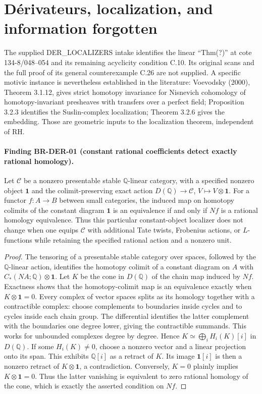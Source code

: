 \section{D\'erivateurs, localization, and information forgotten}
\label{sec:root-derivators}

The supplied DER\_LOCALIZERS intake identifies the linear
``Thm(?)'' at cote 134-8/048--054 and its remaining acyclicity
condition C.10.  Its original scans and the full proof of its
general counterexample C.26 are not supplied.  A specific motivic
instance is nevertheless established in the literature:
Voevodsky (2000), Theorem 3.1.12, gives strict homotopy invariance
for Nisnevich cohomology of homotopy-invariant presheaves with
transfers over a perfect field; Proposition 3.2.3 identifies the
Suslin-complex localization; Theorem 3.2.6 gives the embedding.
Those are geometric inputs to the localization theorem, independent
of RH.

\paragraph{Finding BR-DER-01 (constant rational coefficients detect exactly
rational homology).}
Let $\mathcal C$ be a nonzero presentable stable
$\mathbb Q$-linear category, with a specified nonzero object
$\mathbf1$ and the colimit-preserving exact action
$D(\mathbb Q)\to\mathcal C$, $V\mapsto V\otimes\mathbf1$.
For a functor $f:A\to B$ between small categories, the induced map
on homotopy colimits of the constant diagram $\mathbf1$ is an
equivalence if and only if $Nf$ is a rational homology equivalence.
Thus this particular constant-object localizer does not change
when one equips $\mathcal C$ with additional Tate twists,
Frobenius actions, or $L$-functions while retaining the specified
rational action and a nonzero unit.

\begin{proof}
The tensoring of a presentable stable category over spaces, followed
by the $\mathbb Q$-linear action, identifies the homotopy colimit
of a constant diagram on $A$ with
$C_*(NA;\mathbb Q)\otimes\mathbf1$.  Let $K$ be the cone in
$D(\mathbb Q)$ of the chain map induced by $Nf$.  Exactness shows
that the homotopy-colimit map is an equivalence exactly when
$K\otimes\mathbf1=0$.
Every complex of vector spaces splits as its homology together
with a contractible complex: choose complements to boundaries
inside cycles and to cycles inside each chain group.  The
differential identifies the latter complement with the
boundaries one degree lower, giving the contractible summands.
This works for unbounded complexes degree by degree.  Hence
$K\simeq\bigoplus_i H_i(K)[i]$ in $D(\mathbb Q)$.
If some $H_i(K)\ne0$, choose a nonzero vector and a linear
projection onto its span.  This exhibits $\mathbb Q[i]$ as a
retract of $K$.  Its image $\mathbf1[i]$ is then a nonzero
retract of $K\otimes\mathbf1$, a contradiction.  Conversely,
$K=0$ plainly implies $K\otimes\mathbf1=0$.
Thus the latter vanishing is equivalent to zero rational homology
of the cone, which is exactly the asserted condition on $Nf$.
\end{proof}

